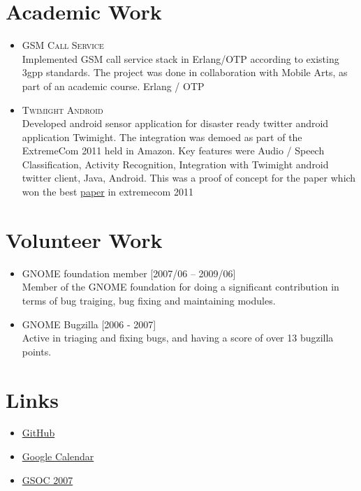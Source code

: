 \documentclass[a4paper,10pt]{article}
\begin{document}
  \section{Academic Work}
  \begin{itemize}
\item \textsc{GSM Call Service} \\

  Implemented GSM call service stack in Erlang/OTP according to existing 3gpp standards. The project
  was done in collaboration with Mobile Arts, as part of an academic course. Erlang / OTP

\item \textsc{Twimight Android} \\
  Developed android sensor application for disaster ready twitter android application Twimight. The
  integration was demoed as part of the ExtremeCom 2011 held in Amazon. Key features were Audio / Speech Classification, Activity Recognition, Integration with Twimight android twitter client, Java, Android. This was a proof of concept for the paper which won the best \href{http://www.tik.ee.ethz.ch/file/ecf9bf3e550dafdd10181f1ca6d08538/extremecom11_twimight.pdf}{paper} in extremecom 2011
  \end{itemize}

  \section {Volunteer Work}
  \begin {itemize}
  \item GNOME foundation member [2007/06 – 2009/06] \\
      Member of the GNOME foundation for doing a significant contribution in terms of bug traiging, bug fixing and maintaining modules.
      
  \item GNOME Bugzilla [2006 - 2007] \\
     Active in triaging and fixing bugs, and having a score of over 13 bugzilla points.      
  \end {itemize}


  \section {Links}
  \begin {itemize}
  \item {\href{https://github.com/ebbywiselyn}{GitHub}}    
  \item {\href{http://www.linux.com/news/software/applications/8226-how-to-sync-evolution-with-googles-pim-apps}{Google Calendar}}
  \item {\href{http://live.gnome.org/SummerOfCode2007/AcceptedProposals}{GSOC 2007}}
  \end {itemize}
      
\end{document}

